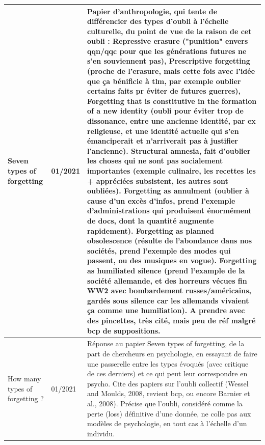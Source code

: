 \documentclass[french]{article}
\begin{document}
    \begin{table}[ht!]
        \begin{center}
        \begin{tabular}{|p{}|p{}|p{}|}

            \hline

            Seven types of forgetting \cite{connerton_seven_2008}
            & 01/2021
            & Papier d'anthropologie, qui tente de différencier des types d'oubli à l'échelle culturelle, du point de vue de la raison de cet oubli :
            Repressive erasure ("punition" envers qqn/qqc pour que les générations futures ne s'en souviennent pas), Prescriptive forgetting (proche de l'erasure, mais cette fois avec l'idée que ça bénificie à tlm, par exemple oublier certains faits pr éviter de futures guerres), Forgetting that is constitutive in the formation of a new identity (oubli pour éviter trop de dissonance, entre une ancienne identité, par ex religieuse, et une identité actuelle qui s'en émanciperait et n'arriverait pas à justifier l'ancienne). Structural amnesia, fait d'oublier les choses qui ne sont pas socialement importantes (exemple culinaire, les recettes les + appréciées subsistent, les autres sont oubliées). Forgetting as annulment (oublier à cause d'un excès d'infos, prend l'exemple d'administrations qui produisent énormément de docs, dont la quantité augmente rapidement). Forgetting as planned obsolescence (résulte de l'abondance dans nos sociétés, prend l'exemple des modes qui passent, ou des musiques en vogue). Forgetting as humiliated silence (prend l'example de la société allemande, et des horreurs vécues fin WW2 avec bombardement russes/américains, gardés sous silence car les allemands vivaient ça comme une humiliation). A prendre avec des pincettes, très cité, mais peu de réf malgré bcp de suppositions.
            \\
            \hline
            How many types of forgetting ? \cite{wessel_how_2008}
            & 01/2021
            & Réponse au papier Seven types of forgetting, de la part de chercheurs en psychologie, en essayant de faire une passerelle entre les types évoqués (avec critique de ces derniers) et ce qui peut leur correspondre en psycho. Cite des papiers sur l'oubli collectif (Wessel and Moulds, 2008, revient bcp, ou encore Barnier et al., 2008). Précise que l'oubli, considéré comme la perte (loss) définitive d'une donnée, ne colle pas aux modèles de psychologie, en tout cas à l'échelle d'un individu.
            \\

\end{tabular}
\end{center}
\end{table}
\end{document}
